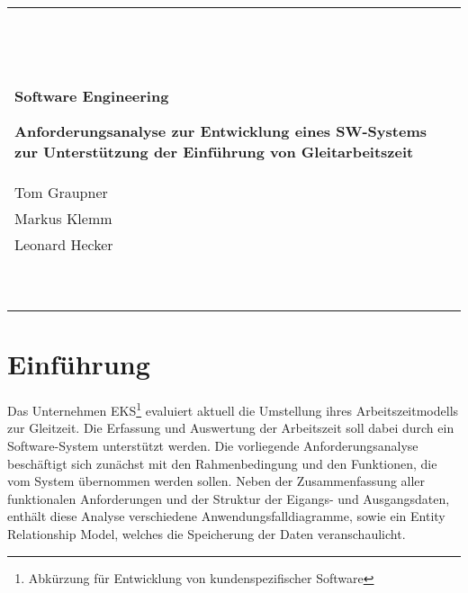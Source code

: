 


\begin{titlepage}
	\begin{tabularx}{\linewidth}{X}		
 		
		\\ \\ \hline	
 		 			
		\vspace{2em}
		
  		\begin{singlespace}
  			\begin{center}    \Large	\bfseries 
  				Software Engineering 
  			\end{center}
  		\end{singlespace}
  		
  		\vspace{2em}
  		
  		\begin{singlespace}
  			\begin{center}	\bfseries 
   				Anforderungsanalyse zur Entwicklung 
				eines SW-Systems zur Unterstützung 
				der Einführung von Gleitarbeitszeit
  			\end{center}
  		\end{singlespace} 
		
		\vspace{18em}
		
  		\begin{center}
  			vorgelegt von \\ 
			\vspace{2em}
 			Tom Graupner \\
			Markus Klemm \\
			Leonard Hecker 
  		\end{center}
		
		\vspace{2em}
		
		\\ \\ \hline
	\end{tabularx}
\end{titlepage}


\tableofcontents

\mainmatter

\chapter{Einführung}
Das Unternehmen \textsc{EKS}\footnote{Abkürzung für Entwicklung von kundenspezifischer Software} evaluiert aktuell die Umstellung ihres Arbeitszeitmodells zur Gleitzeit. Die Erfassung und Auswertung der Arbeitszeit soll dabei durch ein Software-System unterstützt werden. Die vorliegende Anforderungsanalyse beschäftigt sich zunächst mit den Rahmenbedingung und den Funktionen, die vom System übernommen werden sollen. Neben der Zusammenfassung aller funktionalen Anforderungen und der Struktur der Eigangs- und Ausgangsdaten, enthält diese Analyse verschiedene Anwendungsfalldiagramme, sowie ein Entity Relationship Model, welches die Speicherung der Daten veranschaulicht.

